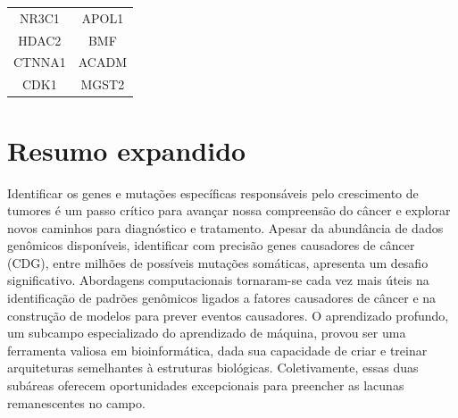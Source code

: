 \documentclass[ppgc, diss, english]{iiufrgs}
\begin{document}
\begin{table}[!bh]
\begin{tabular}{cc}
NR3C1                                                                                      & APOL1                                                                                         \\
HDAC2                                                                                      & BMF                                                                                           \\
CTNNA1                                                                                     & ACADM                                                                                         \\
CDK1                                                                                       & MGST2                                                                                         \\ \hline
\end{tabular}
\end{table}



\chapter{Resumo expandido}
\label{sec:resumoexpandido}

Identificar os genes e mutações específicas responsáveis pelo crescimento de tumores é um passo crítico para avançar nossa compreensão do câncer e explorar novos caminhos para diagnóstico e tratamento. Apesar da abundância de dados genômicos disponíveis, identificar com precisão genes causadores de câncer (CDG), entre milhões de possíveis mutações somáticas, apresenta um desafio significativo. Abordagens computacionais tornaram-se cada vez mais úteis na identificação de padrões genômicos ligados a fatores causadores de câncer e na construção de modelos para prever eventos causadores. O aprendizado profundo, um subcampo especializado do aprendizado de máquina, provou ser uma ferramenta valiosa em bioinformática, dada sua capacidade de criar e treinar arquiteturas semelhantes à estruturas biológicas. Coletivamente, essas duas subáreas oferecem oportunidades excepcionais para preencher as lacunas remanescentes no campo.
\end{document}
